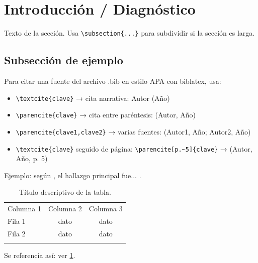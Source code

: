 \documentclass[fleqn, final]{jaes}
\begin{document}
\section{Introducción / Diagnóstico}\label{sec:introduccion}

Texto de la sección. Usa \verb|\subsection{...}| para subdividir si
la sección es larga.

\subsection{Subsección de ejemplo}

Para citar una fuente del archivo .bib en estilo APA con biblatex, usa:
\begin{itemize}
\item \verb|\textcite{clave}| → cita narrativa: Autor (Año)
\item \verb|\parencite{clave}| → cita entre paréntesis: (Autor, Año)
\item \verb|\parencite{clave1,clave2}| → varias fuentes: (Autor1, Año; Autor2, Año)
\item \verb|\textcite{clave}| seguido de página: \verb|\parencite[p.~5]{clave}| → (Autor, Año, p. 5)
\end{itemize}
Ejemplo: según \textcite{ejemplo_clave}, el hallazgo principal fue...
\parencite{ejemplo_clave}.

\begin{table}[tb]
\centering
\caption{Título descriptivo de la tabla.}
\label{table:ejemplo}
{%
\begin{tabular}{@{}lcc@{}}\toprule
Columna 1 & Columna 2 & Columna 3\\\colrule
Fila 1 & dato & dato\\
Fila 2 & dato & dato\\\botrule
\end{tabular}}
\end{table}

Se referencia así: ver \cref{table:ejemplo}.
\end{document}

